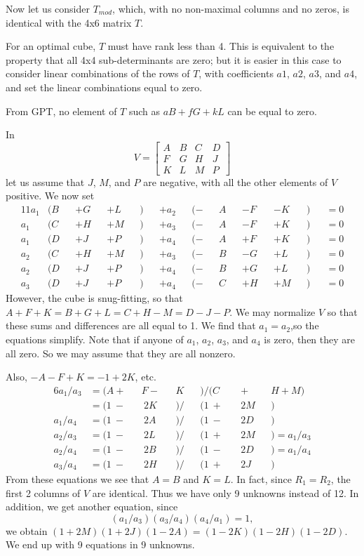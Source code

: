 Now let us consider $T_{mod}$, which, with no non-maximal columns and
no zeros, is identical with the 4x6 matrix $T$.

For an optimal cube, $T$ must have rank less than 4. This is equivalent
to the property that all 4x4 sub-determinants are zero; but it is easier in
this case to consider linear combinations of the rows of $T$, with
coefficients $a1$, $a2$, $a3$, and $a4$, and set the linear combinations
equal to zero.

From GPT, no element of $T$ such as $aB+fG+kL$ can be equal to zero.

In
\begin{equation*}
V =
\begin{bmatrix}
A & B & C & D \\
F & G & H & J \\
K & L & M & P
\end{bmatrix}
\end{equation*}
let us assume that $J$, $M$, and $P$ are negative, with all the other elements
\label{refpage8}
of $V$ positive.  We now set
\label{refpage9}
\begin{alignat*}{11}
a_1 &(B&&+G&&+L&&) &&+ a_2 &&(-&&A&&-F&&-K&&) &&= 0 \\
a_1 &(C&&+H&&+M&&) &&+ a_3 &&(-&&A&&-F&&+K&&) &&= 0 \\
a_1 &(D&&+J&&+P&&) &&+ a_4 &&(-&&A&&+F&&+K&&) &&= 0 \\
a_2 &(C&&+H&&+M&&) &&+ a_3 &&(-&&B&&-G&&+L&&) &&= 0 \\
a_2 &(D&&+J&&+P&&) &&+ a_4 &&(-&&B&&+G&&+L&&) &&= 0 \\
a_3 &(D&&+J&&+P&&) &&+ a_4 &&(-&&C&&+H&&+M&&) &&= 0
\end{alignat*}
However, the cube is snug-fitting, so that $A\!+\!F\!+\!K = B\!+\!G\!+\!L
= C\!+\!H\!-\!M = D\!-\!J\!-\!P$.
We may normalize $V$ so that these sums and differences are all equal to 1.
We find that $a_1 = a_2$,so the equations simplify. Note that if anyone
of $a_1$, $a_2$, $a_3$, and $a_4$ is zero, then they are all zero. So we may
assume that they are all nonzero.

Also, $-\!A\!-\!F\!+\!K = -1\!+\!2K$, etc.
\begin{alignat*}{6}
a_1/a_3 &=  (A+&&F-&&K  &&)/  (C &&+&&\!\!\!H+M)         \\
        &= (1~-&&~2K&&)/&&(1\:+\:&&2M&&)           \\
a_1/a_4 &= (1~-&&~2A&&)/&&(1\:-\:&&2D&&)           \\
a_2/a_3 &= (1~-&&~2L&&)/&&(1\:+\:&&2M&&) = a_1/a_3 \\
a_2/a_4 &= (1~-&&~2B&&)/&&(1\:-\:&&2D&&) = a_1/a_4 \\
a_3/a_4 &= (1~-&&~2H&&)/&&(1\:+\:&&2J&&)
\end{alignat*}
From these equations we see that $A = B$ and $K = L$.  In fact, since $R_1 =
\label{refpage11}
R_2$, the first 2 columns of $V$ are identical.  Thus we have only 9 unknowns
instead of 12.  In addition, we get another equation, since
\begin{equation*}
(a_1/a_3)(a_3/a_4)(a_4/a_1) = 1,
\end{equation*}
we obtain $(1\!+\!2M)(1\!+\!2J)(1\!-\!2A) = (1\!-\!2K)(1\!-\!2H)(1\!-\!2D)$.
\label{refpage1end}
We end up with 9 equations in 9 unknowns.

